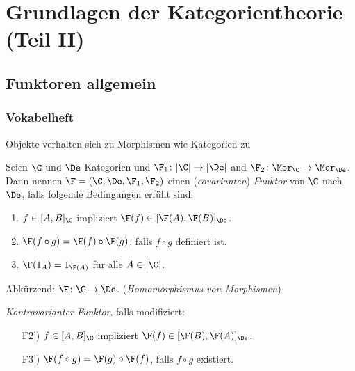 \section{Grundlagen der Kategorientheorie (Teil II)}

\subsection{Funktoren allgemein}

\begin{frame}
  \frametitle{Vokabelheft}
  Objekte verhalten sich zu Morphismen wie
  Kategorien zu 
  \pause
  \begin{defn*}
  Seien $\C$ und $\De$ Kategorien und $\F_1 \colon |\C| \to |\De|$ and $\F_2 \colon \Mor_\C\to \Mor_\De$. 
  Dann nennen $\F = (\C, \De, \F_1, \F_2)$ einen (\emph{covarianten}) \emph{Funktor} von $\C$ nach $\De$, falls folgende Bedingungen erfüllt sind:
  \begin{enumerate}[F1)]
    \item $f \in [A, B]_\C$ impliziert $\F(f) \in [\F(A), \F(B)]_\De$.
    \item $\F(f \circ g) = \F(f) \circ \F(g)$, falls $f \circ g$ definiert ist.
    \item $\F(1_A) = 1_{\F(A)}$ für alle $A \in |\C|$.
  \end{enumerate}
  Abkürzend: $\F \colon \C \to \De$. (\emph{Homomorphismus von Morphismen})

  \pause
  \vspace{1em}
  \emph{Kontravarianter Funktor}, falls modifiziert:
\begin{enumerate}[F1')]
  \item[F2')] $f \in [A, B]_\C$ impliziert $\F(f) \in [\F(B), \F(A)]_\De$.
  \item[F3')] $\F(f \circ g) = \F(g) \circ \F(f)$, falls $f \circ g$ existiert.
\end{enumerate}
  \end{defn*}
\end{frame}

